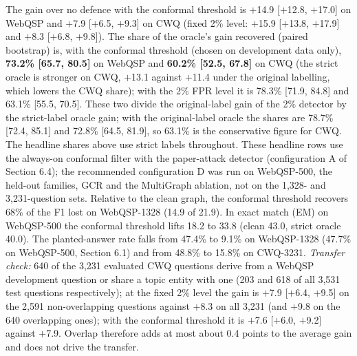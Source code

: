 \documentclass[preprint,12pt]{elsarticle}
\begin{document}
The gain over no defence with the conformal threshold is $+$14.9 [$+$12.8, $+$17.0] on WebQSP and $+$7.9 [$+$6.5, $+$9.3] on CWQ (fixed 2\% level: $+$15.9 [$+$13.8, $+$17.9] and $+$8.3 [$+$6.8, $+$9.8]). The share of the oracle's gain recovered (paired bootstrap) is, with the conformal threshold (chosen on development data only), \textbf{73.2\% [65.7, 80.5]} on WebQSP and \textbf{60.2\% [52.5, 67.8]} on CWQ (the strict oracle is stronger on CWQ, $+$13.1 against $+$11.4 under the original labelling, which lowers the CWQ share); with the 2\% FPR level it is 78.3\% [71.9, 84.8] and 63.1\% [55.5, 70.5]. These two divide the original-label gain of the 2\% detector by the strict-label oracle gain; with the original-label oracle the shares are 78.7\% [72.4, 85.1] and 72.8\% [64.5, 81.9], so 63.1\% is the conservative figure for CWQ. The headline shares above use strict labels throughout. These headline rows use the always-on conformal filter with the paper-attack detector (configuration A of Section 6.4); the recommended configuration D was run on WebQSP-500, the held-out families, GCR and the MultiGraph ablation, not on the 1,328- and 3,231-question sets. Relative to the clean graph, the conformal threshold recovers 68\% of the F1 lost on WebQSP-1328 (14.9 of 21.9). In exact match (EM) on WebQSP-500 the conformal threshold lifts 18.2 to 33.8 (clean 43.0, strict oracle 40.0). The planted-answer rate falls from 47.4\% to 9.1\% on WebQSP-1328 (47.7\% on WebQSP-500, Section 6.1) and from 48.8\% to 15.8\% on CWQ-3231. \emph{Transfer check:} 640 of the 3{,}231 evaluated CWQ questions derive from a WebQSP development question or share a topic entity with one (203 and 618 of all 3{,}531 test questions respectively); at the fixed 2\% level the gain is $+$7.9 [$+$6.4, $+$9.5] on the 2{,}591 non-overlapping questions against $+$8.3 on all 3{,}231 (and $+$9.8 on the 640 overlapping ones); with the conformal threshold it is $+$7.6 [$+$6.0, $+$9.2] against $+$7.9. Overlap therefore adds at most about 0.4 points to the average gain and does not drive the transfer.
\end{document}
